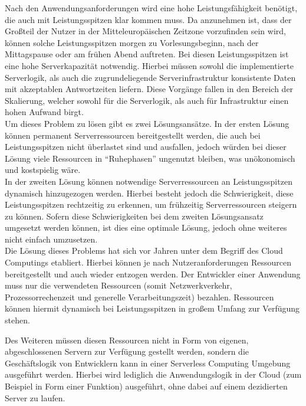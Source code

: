 Nach den Anwendungsanforderungen wird eine hohe Leistungsfähigkeit benötigt, die auch mit Leistungsspitzen klar kommen muss. Da anzunehmen ist, dass der Großteil der Nutzer in der Mitteleuropäischen Zeitzone vorzufinden sein wird, können solche Leistungsspitzen morgen zu Vorlesungsbeginn, nach der Mittagspause oder am frühen Abend auftreten. Bei diesen Leistungsspitzen ist eine hohe Serverkapazität notwendig.
Hierbei müssen sowohl die implementierte Serverlogik, als auch die zugrundeliegende Serverinfrastruktur konsistente Daten mit akzeptablen Antwortzeiten liefern. Diese Vorgänge fallen in den Bereich der Skalierung, welcher sowohl für die Serverlogik, als auch für Infrastruktur einen hohen Aufwand birgt.\\
Um dieses Problem zu lösen gibt es zwei Lösungsansätze. In der ersten Lösung können permanent Serverressourcen bereitgestellt werden, die auch bei Leistungsspitzen nicht überlastet sind und ausfallen, jedoch würden bei dieser Lösung viele Ressourcen in \enquote{Ruhephasen} ungenutzt bleiben, was unökonomisch und kostspielig wäre.\\
In der zweiten Lösung können notwendige Serverressourcen an Leistungsspitzen dynamisch hinzugezogen werden. Hierbei besteht jedoch die Schwierigkeit, diese Leistungsspitzen rechtzeitig zu erkennen, um frühzeitig Serverressourcen steigern zu können. Sofern diese Schwierigkeiten bei dem zweiten Lösungsansatz umgesetzt werden können, ist dies eine optimale Lösung, jedoch ohne weiteres nicht einfach umzusetzen.\\
Die Lösung dieses Problems hat sich vor Jahren unter dem Begriff des Cloud Computings \autocite{definitionOfCloudComputing} etabliert. Hierbei können je nach Nutzeranforderungen Ressourcen bereitgestellt und auch wieder entzogen werden. Der Entwickler einer Anwendung muss nur die verwendeten Ressourcen (somit Netzwerkverkehr, Prozessorrechenzeit und generelle Verarbeitungszeit) bezahlen. Ressourcen können hiermit dynamisch bei Leistungsspitzen in großem Umfang zur Verfügung stehen.%

Des Weiteren müssen diesen Ressourcen nicht in Form von eigenen, abgeschlossenen Servern zur Verfügung gestellt werden, sondern die Geschäftslogik von Entwicklern kann in einer Serverless Computing Umgebung \autocite{definitionOfServerlessComputing} ausgeführt werden. Hierbei wird lediglich die Anwendungslogik in der Cloud (zum Beispiel in Form einer Funktion) ausgeführt, ohne dabei auf einem dezidierten Server zu laufen.

